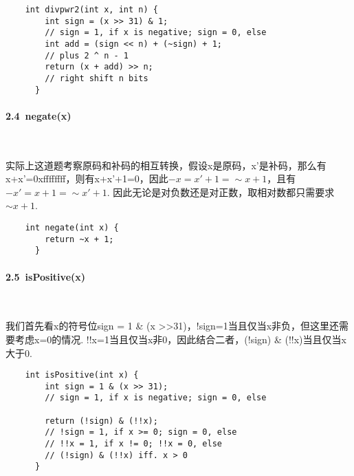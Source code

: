 \documentclass[UTF8]{ctexart}
\begin{document}
\begin{lstlisting}
    int divpwr2(int x, int n) {
        int sign = (x >> 31) & 1;
        // sign = 1, if x is negative; sign = 0, else
        int add = (sign << n) + (~sign) + 1; 
        // plus 2 ^ n - 1
        return (x + add) >> n; 
        // right shift n bits
      }
\end{lstlisting}

\paragraph*{2.4\ negate(x)}\ \par
实际上这道题考察原码和补码的相互转换，假设x是原码，x'是补码，那么有x+x'=0xffffffff，则有x+x'+1=0，因此$-x=x'+1=\sim x + 1$，且有$-x'=x+1=\sim x' + 1$. 因此无论是对负数还是对正数，取相对数都只需要求$\sim x+1$.
\begin{lstlisting}
    int negate(int x) {
        return ~x + 1;
      }
\end{lstlisting}

\paragraph*{2.5\ isPositive(x)}\ \par
我们首先看x的符号位sign = 1 \& (x \textgreater\textgreater 31)，!sign=1当且仅当x非负，但这里还需要考虑x=0的情况. !!x=1当且仅当x非0，因此结合二者，(!sign) \& (!!x)当且仅当x大于0.
\begin{lstlisting}
    int isPositive(int x) {
        int sign = 1 & (x >> 31);
        // sign = 1, if x is negative; sign = 0, else
      
        return (!sign) & (!!x);
        // !sign = 1, if x >= 0; sign = 0, else
        // !!x = 1, if x != 0; !!x = 0, else
        // (!sign) & (!!x) iff. x > 0
      }
\end{lstlisting}
\end{document}
